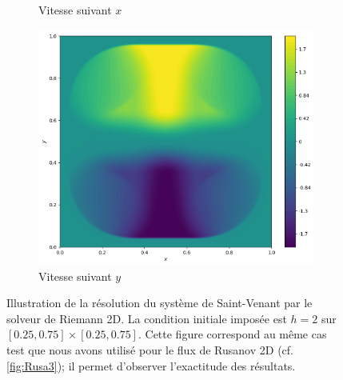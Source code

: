 \documentclass[
	french,
	11pt, %
]{fphw}
\begin{document}
\begin{figure}[H]
\begin{subfigure}{0.32\textwidth}
		\caption{Vitesse suivant $x$}
		\label{fig:Riem3u}
	\end{subfigure}
	\begin{subfigure}{0.32\textwidth}
		\centering
		\includegraphics[width=\textwidth,height=0.85\textwidth]{Riem3v.png}
		\caption{Vitesse suivant $y$}
		\label{fig:Riem3v}
	\end{subfigure}
	\caption{Illustration de la résolution du système de Saint-Venant par le solveur de Riemann 2D. La condition initiale imposée est $ h = 2$ sur $[0.25,0.75]\times[0.25,0.75]$. Cette figure correspond au même cas test que nous avons utilisé pour le flux de Rusanov 2D (cf. \cref{fig:Rusa3}); il permet d'observer l'exactitude des résultats.}
	\label{fig:Riem3}
\end{figure}
\end{document}
